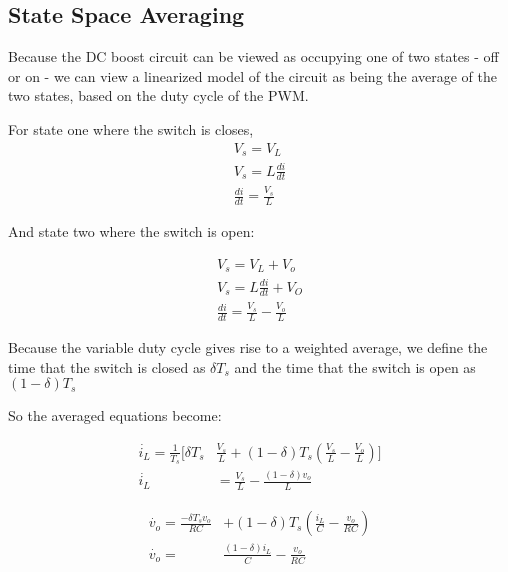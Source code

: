 \subsection{State Space Averaging}

Because the DC boost circuit can be viewed as occupying one of two states - off or on - we can view a linearized model of the circuit as being the average of the two states, based on the duty cycle of the PWM. 

For state one where the switch is closes, 
\begin{equation}
\begin{split}
V_s = V_L \\
V_s = L\frac{di}{dt} \\
\frac{di}{dt} = \frac{V_s}{L}
\end{split}
\end{equation}

And state two where the switch is open:

\begin{equation}
\begin{split}
V_s = V_L + V_o\\
V_s = L\frac{di}{dt} + V_O \\
\frac{di}{dt} = \frac{V_s}{L} - \frac{V_o}{L}
\end{split}
\end{equation}

Because the variable duty cycle gives rise to a weighted average, we define the time that the switch is closed as $\delta T_s$ and the time that the switch is open as $(1-\delta)T_s$

So the averaged equations become: 

\begin{equation}
\begin{split}
\dot{i_L} = \frac{1}{T_s}[\delta T_s & \frac{V_s}{L} + (1-\delta)T_s(\frac{V_s}{L} - \frac{V_o}{L})] \\
\dot{i_L} &= \frac{V_s}{L} - \frac{(1-\delta)v_o}{L}
\end{split}
\end{equation}

\begin{equation}
\begin{split}
\dot{v_o} = \frac{-\delta T_s v_o}{RC}& +  (1-\delta)T_s(\frac{i_L}{C} - \frac{v_o}{RC})\\
\dot{v_o} = &\frac{(1-\delta)i_L}{C} - \frac{v_o}{RC}
\end{split}
\end{equation}

